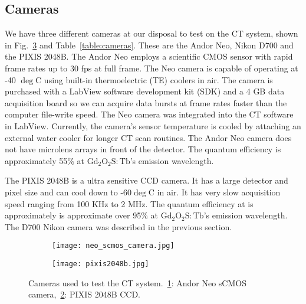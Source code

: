 \begin{figure}
\begin{floatrow}
\end{floatrow}

\end{figure}

\subsection{Cameras}
We have three different cameras at our disposal to test on the CT system, shown in Fig.~\ref{fig:cameras} and Table~\ref{table:cameras}.  These are the Andor Neo, Nikon D700 and the PIXIS 2048B.  The Andor Neo employs a scientific CMOS sensor with rapid frame rates up to 30 fps at full frame.  The Neo camera is capable of operating at -40 $\deg$C using built-in thermoelectric (TE) coolers in air.  The camera is purchased with a LabView software development kit (SDK) and a 4 GB data acquisition board so we can acquire data bursts at frame rates faster than the computer file-write speed.  The Neo camera was integrated into the CT software in LabView.  Currently, the camera's sensor temperature is cooled by attaching an external water cooler for longer CT scan routines.  The Andor Neo camera does not have microlens arrays in front of the detector.  The quantum efficiency is approximately 55\% at $\mathrm{Gd_2O_2S:Tb}$'s emission wavelength.


The PIXIS 2048B is a ultra sensitive CCD camera.  It has a large detector and pixel size and can cool down to -60$\deg$C in air.  It has very slow acquisition speed ranging from 100 KHz to 2 MHz.  The quantum efficiency at is approximately is approximate over 95\% at $\mathrm{Gd_2O_2S:Tb}$'s emission wavelength. The D700 Nikon camera was described in the previous section.

\begin{figure}
	\begin{subfigure}[b]{0.45\linewidth}
	\centering
	\texttt{[image: neo\_scmos\_camera.jpg]}
	\caption{}
	\label{fig:neo}
	\end{subfigure}
\hspace{1 cm}	
	\begin{subfigure}[b]{0.45\linewidth}
	\centering
	\texttt{[image: pixis2048b.jpg]}
	\caption{}
	\label{fig:pixis}
	\end{subfigure}
\caption{Cameras used to test the CT system.~\ref{fig:neo}: Andor Neo sCMOS camera,~\ref{fig:pixis}: PIXIS 2048B CCD.}
\label{fig:cameras}
\end{figure}

